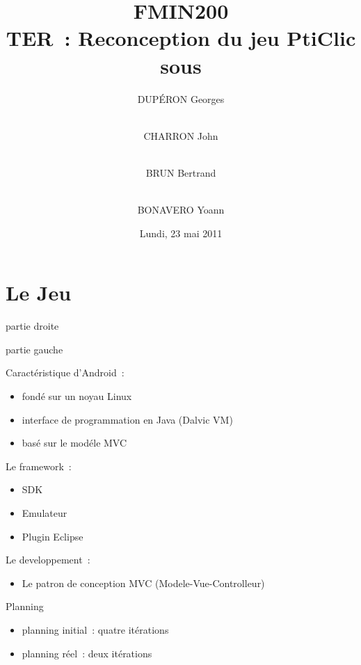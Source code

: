 \documentclass{beamer}
\title{FMIN200 \\ TER~: Reconception du jeu PtiClic sous \android{}}
\author{DUPÉRON Georges \and\\ CHARRON John \and\\ BRUN Bertrand \and\\ BONAVERO Yoann}
\institute{Université Montpellier II, Département informatique}
\date{Lundi, 23 mai 2011}
\def\android{Android\texttrademark}
\begin{document}
\begin{frame}
  \titlepage
\end{frame}

\section{Le Jeu}
\begin{frame}
 \begin{minipage}{\textwidth}
   \centering 
   partie droite
 \end{minipage}
 \begin{minipage}{\textwidth}
   \centering 
   partie gauche
 \end{minipage}
\end{frame}

\begin{frame}
 Caractéristique d'\android{}~:
  \begin{itemize}
    \item<+-> fondé sur un noyau Linux
    \item<+-> interface de programmation en Java (Dalvic VM)
    \item<+-> basé sur le modéle MVC
  \end{itemize}
\end{frame}

\begin{frame}
  Le framework~:
  \begin{itemize}
    \item<+-> SDK
    \item<+-> Emulateur
    \item<+-> Plugin Eclipse
  \end{itemize}
\end{frame}

\begin{frame}
  Le developpement~:
  \begin{itemize}
    \item<+-> Le patron de conception MVC (Modele-Vue-Controlleur) %
  \end{itemize}
\end{frame}

\begin{frame}
  Planning
  \begin{itemize}
  \item planning initial~: quatre itérations
  \item planning réel~: deux itérations
  \end{itemize}
\end{frame}
\end{document}
